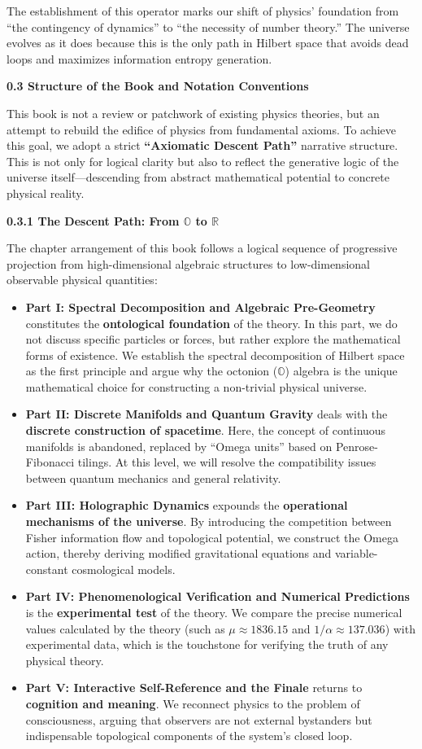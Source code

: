The establishment of this operator marks our shift of physics' foundation from ``the contingency of dynamics'' to ``the necessity of number theory.'' The universe evolves as it does because this is the only path in Hilbert space that avoids dead loops and maximizes information entropy generation.

\textbf{0.3 Structure of the Book and Notation Conventions}

This book is not a review or patchwork of existing physics theories, but an attempt to rebuild the edifice of physics from fundamental axioms. To achieve this goal, we adopt a strict \textbf{``Axiomatic Descent Path''} narrative structure. This is not only for logical clarity but also to reflect the generative logic of the universe itself---descending from abstract mathematical potential to concrete physical reality.

\textbf{0.3.1 The Descent Path: From $\mathbb{O}$ to $\mathbb{R}$}

The chapter arrangement of this book follows a logical sequence of progressive projection from high-dimensional algebraic structures to low-dimensional observable physical quantities:

\begin{itemize}
\item \textbf{Part I: Spectral Decomposition and Algebraic Pre-Geometry} constitutes the \textbf{ontological foundation} of the theory. In this part, we do not discuss specific particles or forces, but rather explore the mathematical forms of existence. We establish the spectral decomposition of Hilbert space as the first principle and argue why the octonion ($\mathbb{O}$) algebra is the unique mathematical choice for constructing a non-trivial physical universe.
\item \textbf{Part II: Discrete Manifolds and Quantum Gravity} deals with the \textbf{discrete construction of spacetime}. Here, the concept of continuous manifolds is abandoned, replaced by ``Omega units'' based on Penrose-Fibonacci tilings. At this level, we will resolve the compatibility issues between quantum mechanics and general relativity.
\item \textbf{Part III: Holographic Dynamics} expounds the \textbf{operational mechanisms of the universe}. By introducing the competition between Fisher information flow and topological potential, we construct the Omega action, thereby deriving modified gravitational equations and variable-constant cosmological models.
\item \textbf{Part IV: Phenomenological Verification and Numerical Predictions} is the \textbf{experimental test} of the theory. We compare the precise numerical values calculated by the theory (such as $\mu \approx 1836.15$ and $1/\alpha \approx 137.036$) with experimental data, which is the touchstone for verifying the truth of any physical theory.
\item \textbf{Part V: Interactive Self-Reference and the Finale} returns to \textbf{cognition and meaning}. We reconnect physics to the problem of consciousness, arguing that observers are not external bystanders but indispensable topological components of the system's closed loop.
\end{itemize}

